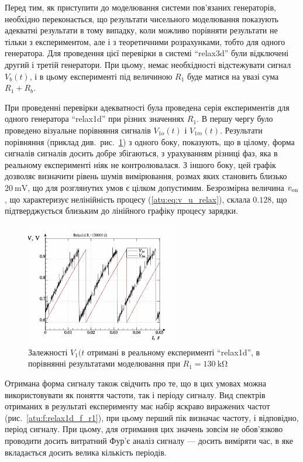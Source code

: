 Перед тим, як приступити до моделювання системи пов'язаних
генераторів, необхідно переконається, що результати
чисельного моделювання показують адекватні результати в
тому випадку, коли можливо порівняти результати не тільки з
експериментом, але і з теоретичними розрахунками, тобто для
одного генератора. Для проведення цієї перевірки в системі
``relax3d'' були відключені другий і третій генератори. При цьому,
немає необхідності відстежувати сигнал
$ V_b (t) $, і в цьому експерименті під величиною
$ R_1 $ буде матися на увазі сума
$ R_1 + R_b $.

При проведенні перевірки адекватності була проведена серія
експериментів для одного генератора ``relax1d'' при різних значеннях
$R_1$. В першу чергу було проведено візуальне порівняння сигналів
$V_{1o}(t) $ і
$V_{1m}(t) $. Результати порівняння (приклад
див.~рис.~\ref{atu:f:relax1d_read_cmp-p_t_r1}) з одного боку, показують, що в
цілому, форма сигналів сигналів досить добре збігаються, з
урахуванням різниці фаз, яка в реальному експерименті ніяк не
контролювалася. З іншого боку, цей графік дозволяє визначити
рівень шумів вимірювання, розмах яких становить близько
$ \SI{20}{\milli \volt} $, що для розглянутих умов є цілком
допустимим. Безрозмірна величина
$ v _\mathrm{on} $, що характеризує нелінійність процесу (\ref{atu:eq:v_u_relax}),
склала
$ 0.128 $, що підтверджується близьким до лінійного графіку процесу
зарядки.



\begin{figure}[htb!]
  \centerline{\includegraphics[width=0.6\textwidth]{p/relax1d_read_cmp-p_t_r1=130k.png} }
\caption{Залежності $V_1(t $ отримані в реальному експерименті ``relax1d'', в порівнянні результатами моделювання при $ R_1 = \SI{130}{\kilo \ohm} $}
\label{atu:f:relax1d_read_cmp-p_t_r1}
\end{figure}

Отримана форма сигналу також свідчить про те, що в цих умовах
можна використовувати як поняття частоти, так і періоду
сигналу. Вид спектрів отриманих в результаті експерименту має
набір яскраво виражених частот (рис.~\ref{atu:f:relax1d_f_r1}), при
цьому перший пік визначає частоту, і відповідно, період
сигналу. При цьому, для отримання цих значень зовсім не
обов'язково проводити досить витратний Фур'є аналіз сигналу ---
досить виміряти час, в яке вкладається досить велика кількість
періодів.


